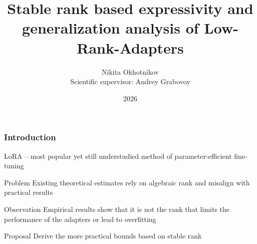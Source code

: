 \documentclass[10pt]{beamer}
\title[]{Stable rank based expressivity and generalization analysis of Low-Rank-Adapters}
\author{Nikita Okhotnikov\\ Scientific supervisor: Andrey Grabovoy}
\institute{MIPT}
\date{2026}
\begin{document}
\begin{frame}
  \titlepage{}
\end{frame}


\begin{frame}
    \frametitle{Introduction}
        LoRA -- most popular yet still understudied method of parameter-efficient fine-tuning
    \vfill
    \begin{block}{Problem}
        Existing theoretical estimates rely on algebraic rank and misalign with practical results
    \end{block}
    \vfill
    \begin{block}{Observation}
        Empirical results show that it is not the rank that limits the performance of the adapters or lead to overfitting
    \end{block}
    \vfill
    \begin{block}{Proposal}
        Derive the more practical bounds based on stable rank 
    \end{block}
\end{frame}
\end{document}
